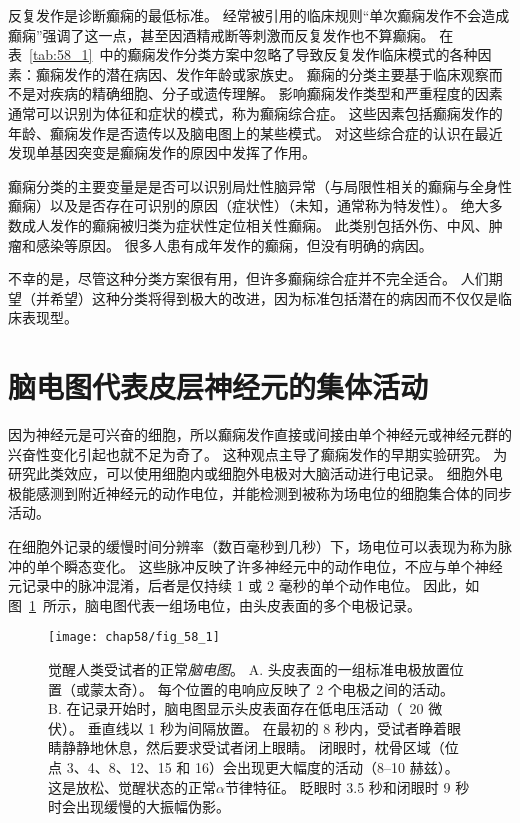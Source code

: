 反复发作是诊断癫痫的最低标准。
经常被引用的临床规则“单次癫痫发作不会造成癫痫”强调了这一点，甚至因酒精戒断等刺激而反复发作也不算癫痫。
在表~\ref{tab:58_1}~中的癫痫发作分类方案中忽略了导致反复发作临床模式的各种因素：癫痫发作的潜在病因、发作年龄或家族史。
癫痫的分类主要基于临床观察而不是对疾病的精确细胞、分子或遗传理解。
影响癫痫发作类型和严重程度的因素通常可以识别为体征和症状的模式，称为癫痫综合症。
这些因素包括癫痫发作的年龄、癫痫发作是否遗传以及脑电图上的某些模式。
对这些综合症的认识在最近发现单基因突变是癫痫发作的原因中发挥了作用。


癫痫分类的主要变量是是否可以识别局灶性脑异常（与局限性相关的癫痫与全身性癫痫）以及是否存在可识别的原因（症状性）（未知，通常称为特发性）。
绝大多数成人发作的癫痫被归类为症状性定位相关性癫痫。
此类别包括外伤、中风、肿瘤和感染等原因。
很多人患有成年发作的癫痫，但没有明确的病因。


不幸的是，尽管这种分类方案很有用，但许多癫痫综合症并不完全适合。
人们期望（并希望）这种分类将得到极大的改进，因为标准包括潜在的病因而不仅仅是临床表现型。



\section{脑电图代表皮层神经元的集体活动}

因为神经元是可兴奋的细胞，所以癫痫发作直接或间接由单个神经元或神经元群的兴奋性变化引起也就不足为奇了。
这种观点主导了癫痫发作的早期实验研究。
为研究此类效应，可以使用细胞内或细胞外电极对大脑活动进行电记录。
细胞外电极能感测到附近神经元的动作电位，并能检测到被称为场电位的细胞集合体的同步活动。


在细胞外记录的缓慢时间分辨率（数百毫秒到几秒）下，场电位可以表现为称为脉冲的单个瞬态变化。
这些脉冲反映了许多神经元中的动作电位，不应与单个神经元记录中的脉冲混淆，后者是仅持续 1 或 2 毫秒的单个动作电位。
因此，如图~\ref{fig:58_1}~所示，脑电图代表一组场电位，由头皮表面的多个电极记录。


\begin{figure}[htbp]
	\centering
	\texttt{[image: chap58/fig\_58\_1]}
	\caption{觉醒人类受试者的正常\textit{脑电图}。
		A. 头皮表面的一组标准电极放置位置（或蒙太奇）。
		每个位置的电响应反映了 2 个电极之间的活动。
		B. 在记录开始时，脑电图显示头皮表面存在低电压活动（~20 微伏）。
		垂直线以 1 秒为间隔放置。
		在最初的 8 秒内，受试者睁着眼睛静静地休息，然后要求受试者闭上眼睛。
		闭眼时，枕骨区域（位点 3、4、8、12、15 和 16）会出现更大幅度的活动（8–10 赫兹）。
		这是放松、觉醒状态的正常$ \alpha $节律特征。
		眨眼时 3.5 秒和闭眼时 9 秒时会出现缓慢的大振幅伪影。}
	\label{fig:58_1}
\end{figure}


